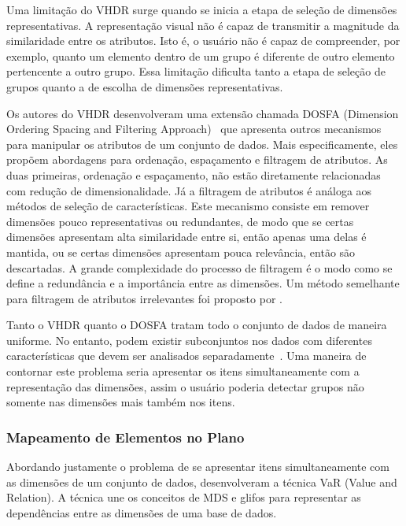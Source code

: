 Uma limitação do VHDR surge quando se inicia a etapa de
seleção de dimensões representativas. A representação visual
não é capaz de transmitir a magnitude da similaridade entre
os atributos. Isto é, o usuário não é capaz de compreender,
por exemplo, quanto um elemento dentro de um grupo é
diferente de outro elemento pertencente a outro grupo. Essa
limitação dificulta tanto a etapa de seleção de grupos
quanto a de escolha de dimensões representativas.

Os autores do VHDR desenvolveram uma extensão chamada DOSFA
(Dimension Ordering Spacing and Filtering
Approach)~\cite{DOSFA} que apresenta outros mecanismos para
manipular os atributos de um conjunto de dados. Mais
especificamente, eles propõem abordagens para ordenação,
espaçamento e filtragem de atributos. As duas primeiras,
ordenação e espaçamento, não estão diretamente relacionadas
com redução de dimensionalidade. Já a filtragem de atributos
é análoga aos métodos de seleção de características. Este
mecanismo consiste em remover dimensões pouco
representativas ou redundantes, de modo que se certas
dimensões apresentam alta similaridade entre si, então
apenas uma delas é mantida, ou se certas dimensões
apresentam pouca relevância, então são descartadas. A grande
complexidade do processo de filtragem é o modo como se
define a redundância e a importância entre as dimensões. Um
método semelhante para filtragem de atributos irrelevantes
foi proposto por \cite{Artero2006}.

Tanto o VHDR quanto o DOSFA tratam todo o conjunto de dados
de maneira uniforme. No entanto, podem existir subconjuntos
nos dados com diferentes características que devem ser
analisados separadamente~\cite{May2011}. Uma maneira de
contornar este problema seria apresentar os itens
simultaneamente com a representação das dimensões, assim o
usuário poderia detectar grupos não somente nas dimensões
mais também nos itens.

\subsubsection{Mapeamento de Elementos no Plano}

Abordando justamente o problema de se apresentar itens
simultaneamente com as dimensões de um conjunto de dados,
\cite{Yang2004} desenvolveram a técnica VaR (Value and
Relation). A técnica une os conceitos de MDS e glifos para
representar as dependências entre as dimensões de uma base
de dados. 

